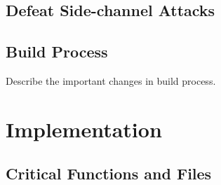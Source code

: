\documentclass[11pt,oneside,onecolumn,letterpaper]{article}
\begin{document}
\subsection{Defeat Side-channel Attacks}

\subsection{Build Process}

  Describe the important changes in build process.

\section{Implementation}
\subsection{Critical Functions and Files}



\end{document}
